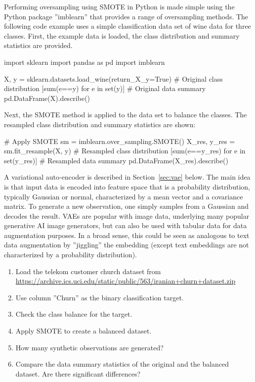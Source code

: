 \begin{withcode}
Performing oversampling using SMOTE in Python is made simple using the Python package ''imblearn'' that provides a range of oversampling methods. The following code example uses a simple classification data set of wine data for three classes. First, the example data is loaded, the class distribution and summary statistics are provided.

\begin{pythoncode}
import sklearn
import pandas as pd
import imblearn 

X, y = sklearn.datasets.load_wine(return_X_y=True)
# Original class distribution
[sum(e==y) for e in set(y)]
# Original data summary
pd.DataFrame(X).describe()
\end{pythoncode}

Next, the SMOTE method is applied to the data set to balance the classes. The resampled class distribution and summary statistics are shown:

\begin{pythoncode}
# Apply SMOTE
sm = imblearn.over_sampling.SMOTE()
X_res, y_res = sm.fit_resample(X, y)
# Resampled class distribution
[sum(e==y_res) for e in set(y_res)]
# Resampled data summary
pd.DataFrame(X_res).describe()
\end{pythoncode}

A variational auto-encoder is described in Section~\ref{sec:vae} below. The main idea is that input data is encoded into feature space that is a probability distribution, typically Gaussian or normal, characterized by a mean vector and a covariance matrix. To generate a new observation, one simply samples from a Gaussian and decodes the result. VAEs are popular with image data, underlying many popular generative AI image generators, but can also be used with tabular data for data augmentation purposes. In a broad sense, this could be seen as analogous to text data augmentation by ''jiggling'' the embedding (except text embeddings are not characterized by a probability distribution). 

\begin{exerciseboxcomputer}
\begin{enumerate}
  \item Load the telekom customer church dataset from\\
  \url{https://archive.ics.uci.edu/static/public/563/iranian+churn+dataset.zip}
  \item Use column ''Churn'' as the binary classification target.
  \item Check the class balance for the target.
  \item Apply SMOTE to create a balanced dataset.
  \item How many synthetic observations are generated?
  \item Compare the data summary statistics of the original and the balanced dataset. Are there significant differences?
\end{enumerate}
\end{exerciseboxcomputer}
\end{withcode}

